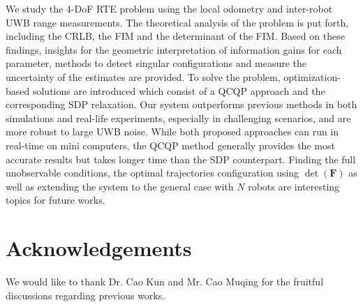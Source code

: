 \documentclass[journal]{IEEEtran}
\def\FIM{\mathbf{F}}
\def\detF{\det(\FIM)}
\begin{document}
We study the 4-DoF RTE problem using the local odometry and inter-robot UWB range measurements. The theoretical analysis of the problem is put forth, including the CRLB, the FIM and the determinant of the FIM. Based on these findings, insights for the geometric interpretation of information gains for each parameter, methods to detect singular configurations and measure the uncertainty of the estimates are provided. To solve the problem, optimization-based solutions are introduced which consist of a QCQP approach and the corresponding SDP relaxation. Our system outperforms previous methods in both simulations and real-life experiments, especially in challenging scenarios, and are more robust to large UWB noise. While both proposed approaches can run in real-time on mini computers, the QCQP method generally provides the most accurate results but takes longer time than the SDP counterpart. Finding the full unobservable conditions, the optimal trajectories configuration using $\detF$ as well as extending the system to the general case with $N$ robots  are interesting topics for future works.


\section*{Acknowledgements}
We would like to thank Dr. Cao Kun and Mr. Cao Muqing for the fruitful discussions regarding previous works.
\end{document}
